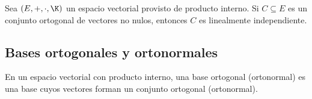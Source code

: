 \documentclass[compacto,10pt]{pubciencias-notas}
\begin{document}
\begin{cor}
    Sea $(E,+,\cdot,\K)$ un espacio vectorial provisto de producto interno. Si $C \subseteq E$ es un conjunto ortogonal de vectores no nulos, entonces $C$ es linealmente independiente.
\end{cor}

\subsection{Bases ortogonales y ortonormales}

\begin{defi}
    En un espacio vectorial con producto interno, una base ortogonal (ortonormal) es una base cuyos vectores forman un conjunto ortogonal (ortonormal). 
\end{defi}

    


    
\end{document}
